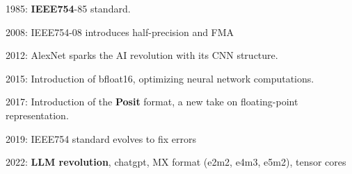 \begin{frame}[t]
\begin{myitemize}
\item<7> 1985: \textbf{IEEE754}-85 standard.
\item<8> 2008: IEEE754-08 introduces half-precision and FMA
\item<9> 2012: AlexNet sparks the AI revolution with its CNN structure.
\item<10> 2015: Introduction of bfloat16, optimizing neural network computations.
\item<11-> 2017: Introduction of the \textbf{Posit} format, a new take on floating-point representation.
\item<12> 2019: IEEE754 standard evolves to fix errors
\item<13-> 2022: \textbf{LLM revolution}, chatgpt, MX format (e2m2, e4m3, e5m2), tensor cores
\end{myitemize}


\normalsize
\end{frame}


